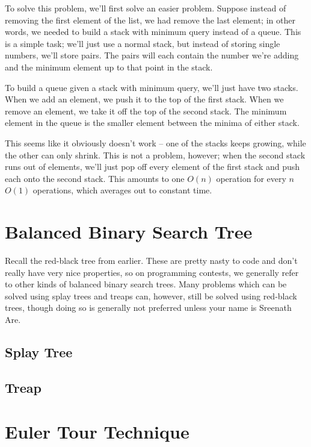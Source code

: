 \documentclass[11pt]{book}
\begin{document}
To solve this problem, we'll first solve an easier problem. Suppose instead of removing the first element of the list, we had remove the last element; in other words, we needed to build a stack with minimum query instead of a queue. This is a simple task; we'll just use a normal stack, but instead of storing single numbers, we'll store pairs. The pairs will each contain the number we're adding and the minimum element up to that point in the stack.

To build a queue given a stack with minimum query, we'll just have two stacks. When we add an element, we push it to the top of the first stack. When we remove an element, we take it off the top of the second stack. The minimum element in the queue is the smaller element between the minima of either stack.

This seems like it obviously doesn't work -- one of the stacks keeps growing, while the other can only shrink. This is not a problem, however; when the second stack runs out of elements, we'll just pop off every element of the first stack and push each onto the second stack. This amounts to one $O(n)$ operation for every $n$ $O(1)$ operations, which averages out to constant time.

\section{Balanced Binary Search Tree}

Recall the red-black tree from earlier. These are pretty nasty to code and don't really have very nice properties, so on programming contests, we generally refer to other kinds of balanced binary search trees. Many problems which can be solved using splay trees and treaps can, however, still be solved using red-black trees, though doing so is generally not preferred unless your name is Sreenath Are.

\subsection{Splay Tree}

\subsection{Treap}

\section{Euler Tour Technique}
\end{document}
